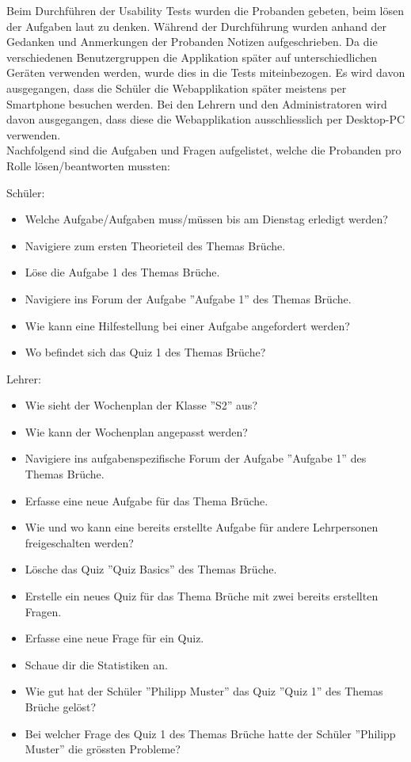 Beim Durchführen der Usability Tests wurden die Probanden gebeten, beim lösen der Aufgaben laut zu denken. Während der Durchführung wurden anhand der Gedanken und Anmerkungen der Probanden Notizen aufgeschrieben. Da die verschiedenen Benutzergruppen die Applikation später auf unterschiedlichen Geräten verwenden werden, wurde dies in die Tests miteinbezogen. Es wird davon ausgegangen, dass die Schüler die Webapplikation später meistens per Smartphone besuchen werden. Bei den Lehrern und den Administratoren wird davon ausgegangen, dass diese die Webapplikation ausschliesslich per Desktop-PC verwenden. \\

Nachfolgend sind die Aufgaben und Fragen aufgelistet, welche die Probanden pro Rolle lösen/beantworten mussten:

Schüler: \\
\begin{itemize}
	\item Welche Aufgabe/Aufgaben muss/müssen bis am Dienstag erledigt werden?
	\item Navigiere zum ersten Theorieteil des Themas Brüche.
	\item Löse die Aufgabe 1 des Themas Brüche.
	\item Navigiere ins Forum der Aufgabe ''Aufgabe 1'' des Themas Brüche.
	\item Wie kann eine Hilfestellung bei einer Aufgabe angefordert werden?
	\item Wo befindet sich das Quiz 1 des Themas Brüche?
\end{itemize}


Lehrer: \\
\begin{itemize}
	\item Wie sieht der Wochenplan der Klasse ''S2'' aus?
	\item Wie kann der Wochenplan angepasst werden?
	\item Navigiere ins aufgabenspezifische Forum der Aufgabe ''Aufgabe 1'' des Themas Brüche.
	\item Erfasse eine neue Aufgabe für das Thema Brüche.
	\item Wie und wo kann eine bereits erstellte Aufgabe für andere Lehrpersonen freigeschalten werden?
	\item Lösche das Quiz ''Quiz Basics'' des Themas Brüche.
	\item Erstelle ein neues Quiz für das Thema Brüche mit zwei bereits erstellten Fragen.
	\item Erfasse eine neue Frage für ein Quiz.
	\item Schaue dir die Statistiken an.
	\item Wie gut hat der Schüler ''Philipp Muster'' das Quiz ''Quiz 1'' des Themas Brüche gelöst?
	\item Bei welcher Frage des Quiz 1 des Themas Brüche hatte der Schüler ''Philipp Muster'' die grössten Probleme?
\end{itemize}


